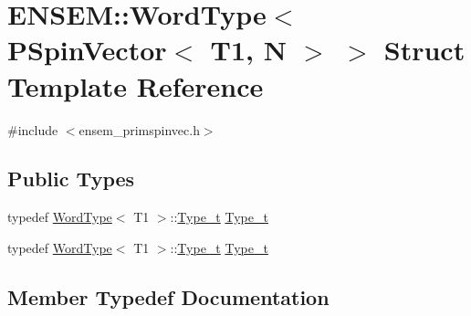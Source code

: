 \hypertarget{structENSEM_1_1WordType_3_01PSpinVector_3_01T1_00_01N_01_4_01_4}{}\section{E\+N\+S\+EM\+:\+:Word\+Type$<$ P\+Spin\+Vector$<$ T1, N $>$ $>$ Struct Template Reference}
\label{structENSEM_1_1WordType_3_01PSpinVector_3_01T1_00_01N_01_4_01_4}


{\ttfamily \#include $<$ensem\+\_\+primspinvec.\+h$>$}

\subsection*{Public Types}
\begin{DoxyCompactItemize}
\item 
typedef \mbox{\hyperlink{structENSEM_1_1WordType}{Word\+Type}}$<$ T1 $>$\+::\mbox{\hyperlink{structENSEM_1_1WordType_3_01PSpinVector_3_01T1_00_01N_01_4_01_4_addbb91e7d2c1c1c79f012acf1cd02ce3}{Type\+\_\+t}} \mbox{\hyperlink{structENSEM_1_1WordType_3_01PSpinVector_3_01T1_00_01N_01_4_01_4_addbb91e7d2c1c1c79f012acf1cd02ce3}{Type\+\_\+t}}
\item 
typedef \mbox{\hyperlink{structENSEM_1_1WordType}{Word\+Type}}$<$ T1 $>$\+::\mbox{\hyperlink{structENSEM_1_1WordType_3_01PSpinVector_3_01T1_00_01N_01_4_01_4_addbb91e7d2c1c1c79f012acf1cd02ce3}{Type\+\_\+t}} \mbox{\hyperlink{structENSEM_1_1WordType_3_01PSpinVector_3_01T1_00_01N_01_4_01_4_addbb91e7d2c1c1c79f012acf1cd02ce3}{Type\+\_\+t}}
\end{DoxyCompactItemize}


\subsection{Member Typedef Documentation}
\mbox{\label{structENSEM_1_1WordType_3_01PSpinVector_3_01T1_00_01N_01_4_01_4_addbb91e7d2c1c1c79f012acf1cd02ce3}} 
